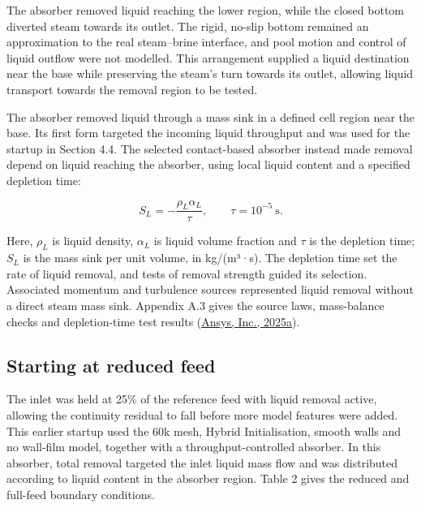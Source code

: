 \documentclass[12pt]{article}
\begin{document}
The absorber removed liquid reaching the lower region, while the closed bottom diverted steam towards its outlet. The rigid, no-slip bottom remained an approximation to the real steam--brine interface, and pool motion and control of liquid outflow were not modelled. This arrangement supplied a liquid destination near the base while preserving the steam's turn towards its outlet, allowing liquid transport towards the removal region to be tested.

\par\noindent\begin{minipage}{\linewidth}
The absorber removed liquid through a mass sink in a defined cell region near the base. Its first form targeted the incoming liquid throughput and was used for the startup in Section 4.4. The selected contact-based absorber instead made removal depend on liquid reaching the absorber, using local liquid content and a specified depletion time:

\[
S_L=-\frac{\rho_L\alpha_L}{\tau},\qquad \tau=10^{-5}\ \mathrm{s}.
\tag{3}
\]

Here, \(\rho_L\) is liquid density, \(\alpha_L\) is liquid volume fraction and \(\tau\) is the depletion time; \(S_L\) is the mass sink per unit volume, in kg/(m³·s). The depletion time set the rate of liquid removal, and tests of removal strength guided its selection. Associated momentum and turbulence sources represented liquid removal without a direct steam mass sink. Appendix A.3 gives the source laws, mass-balance checks and depletion-time test results (\href{https://ansyshelp.ansys.com/public/Views/Secured/corp/v252/en/flu_ug/flu_ug_bcs_sec_cell_zones.html}{Ansys, Inc., 2025a}).
\end{minipage}\par\medskip

\subsection{Starting at reduced feed}\label{starting-at-reduced-feed}

The inlet was held at 25\% of the reference feed with liquid removal active, allowing the continuity residual to fall before more model features were added. This earlier startup used the 60k mesh, Hybrid Initialisation, smooth walls and no wall-film model, together with a throughput-controlled absorber. In this absorber, total removal targeted the inlet liquid mass flow and was distributed according to liquid content in the absorber region. Table 2 gives the reduced and full-feed boundary conditions.
\end{document}

